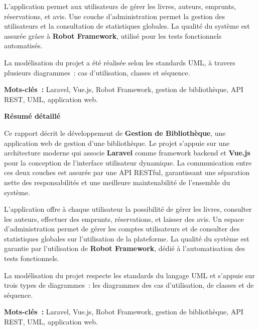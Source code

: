 \documentclass{rapportPFA}
\begin{document}
L'application permet aux utilisateurs de gérer les livres, auteurs, emprunts, réservations,
et avis. Une couche d'administration permet la gestion des utilisateurs et la consultation
de statistiques globales. La qualité du système est assurée grâce à \textbf{Robot Framework},
utilisé pour les tests fonctionnels automatisés.

La modélisation du projet a été réalisée selon les standards UML, à
travers plusieurs diagrammes~: cas d'utilisation, classes et séquence.

\textbf{Mots-clés~:} Laravel, Vue.js, Robot Framework, gestion de bibliothèque,
API REST, UML, application web.

\newpage
\thispagestyle{empty}
{}
\vspace*{3cm}
\begin{center}
    {\LARGE \textbf{Résumé détaillé}}
\end{center}
\vspace{2cm}

Ce rapport décrit le développement de \textbf{Gestion de Bibliothèque}, une application web de
gestion d'une bibliothèque. Le projet s'appuie sur une architecture moderne qui
associe \textbf{Laravel} comme framework backend et \textbf{Vue.js} pour la conception
de l'interface utilisateur dynamique. La communication entre ces deux couches est
assurée par une API RESTful, garantissant une séparation nette des responsabilités
et une meilleure maintenabilité de l'ensemble du système.

L'application offre à chaque utilisateur la possibilité de gérer les livres, consulter les auteurs,
effectuer des emprunts, réservations, et laisser des avis. Un espace
d'administration permet de gérer les comptes utilisateurs et de consulter des
statistiques globales sur l'utilisation de la plateforme. La qualité du système
est garantie par l'utilisation de \textbf{Robot Framework}, dédié à
l'automatisation des tests fonctionnels.

La modélisation du projet respecte les standards du langage UML et s'appuie sur
trois types de diagrammes~: les diagrammes des cas d'utilisation, de classes et de
séquence.

\textbf{Mots-clés~:} Laravel, Vue.js, Robot Framework, gestion de bibliothèque,
API REST, UML, application web.

\newpage
\tabledematieres
\end{document}

